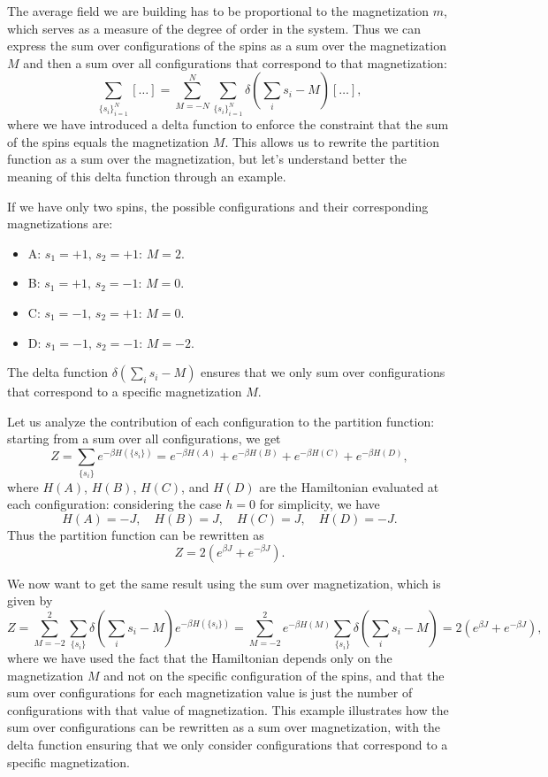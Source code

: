 The average field we are building has to be proportional to the magnetization \(m\), which serves as a measure of the degree of order in the system. Thus we can express the sum over configurations of the spins as a sum over the magnetization \(M\) and then a sum over all configurations that correspond to that magnetization:
\[
    \sum_{\{s_i\}_{i=1}^N} [\dots] = \sum_{M=-N}^{N} \sum_{\{s_i\}_{i=1}^N} \delta\left(\sum_{i} s_i - M\right)[\dots],
\]
where we have introduced a delta function to enforce the constraint that the sum of the spins equals the magnetization \(M\). This allows us to rewrite the partition function as a sum over the magnetization, but let's understand better the meaning of this delta function through an example.

\begin{example}[\(N=2\)]
    If we have only two spins, the possible configurations and their corresponding magnetizations are:
    \begin{itemize}
        \item A: \(s_1 = +1,\, s_2 = +1\): \(M = 2\).
        \item B: \(s_1 = +1,\, s_2 = -1\): \(M = 0\).
        \item C: \(s_1 = -1,\, s_2 = +1\): \(M = 0\).
        \item D: \(s_1 = -1,\, s_2 = -1\): \(M = -2\).
    \end{itemize}
    The delta function \(\delta\left(\sum_{i} s_i - M\right)\) ensures that we only sum over configurations that correspond to a specific magnetization \(M\).

    Let us analyze the contribution of each configuration to the partition function: starting from a sum over all configurations, we get
    \[
        Z = \sum_{\{s_i\}} e^{-\beta H(\{s_i\})} = e^{- \beta H(A)} + e^{-\beta H(B)} + e^{-\beta H(C)} + e^{-\beta H(D)},
    \]
    where \(H(A)\), \(H(B)\), \(H(C)\), and \(H(D)\) are the Hamiltonian evaluated at each configuration: considering the case \(h=0\) for simplicity, we have
    \[
        H(A) = -J, \quad H(B) = J, \quad H(C) = J, \quad H(D) = -J.
    \]
    Thus the partition function can be rewritten as
    \[
        Z = 2 (e^{\beta J} + e^{-\beta J}).
    \]

    We now want to get the same result using the sum over magnetization, which is given by
    \[
        Z = \sum_{M = -2}^2 \sum_{\{s_i\}} \delta\left(\sum_{i} s_i - M\right) e^{-\beta H(\{s_i\})} = \sum_{M = -2}^2 e^{-\beta H(M)} \sum_{\{s_i\}} \delta\left(\sum_{i} s_i - M\right) = 2 (e^{\beta J} + e^{-\beta J}),
    \]
    where we have used the fact that the Hamiltonian depends only on the magnetization \(M\) and not on the specific configuration of the spins, and that the sum over configurations for each magnetization value is just the number of configurations with that value of magnetization. This example illustrates how the sum over configurations can be rewritten as a sum over magnetization, with the delta function ensuring that we only consider configurations that correspond to a specific magnetization.
\end{example}

